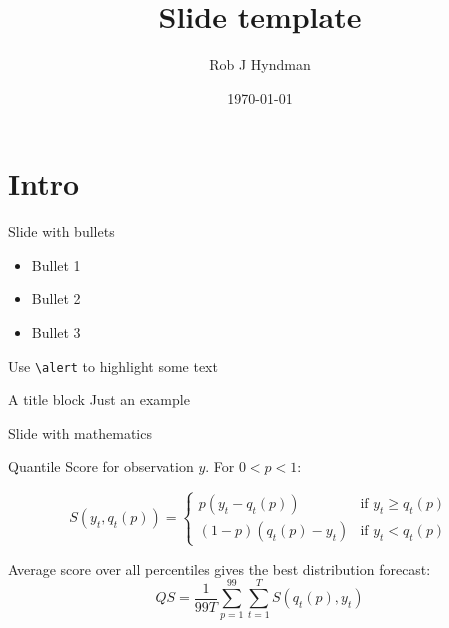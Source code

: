\documentclass[14pt,a4paper]{beamer}
\title{Slide template}
\author{Rob J Hyndman}
\date{\today}
\begin{document}
\begin{frame}
\titlepage
\end{frame}

\section{Intro}

\begin{frame}[fragile]{Slide with bullets}

\begin{itemize}
  \item Bullet 1
  \item Bullet 2
  \item Bullet 3
\end{itemize}


Use \verb|\alert| to \alert{highlight} some text

\begin{block}{A title block}
Just an example
\end{block}

\end{frame}

\begin{frame}{Slide with mathematics}

  Quantile Score for observation $y$.   For $0<p<1$:
  \begin{block}{}
    \[
      S(y_t,q_t(p)) = \left\{
      \begin{array}{rl}
      p(y_t-q_t(p)) & \text{if $y_t \ge q_t(p)$}\\
      (1-p)(q_t(p)-y_t) & \text{if $y_t < q_t(p)$}
      \end{array}\right.
    \]
  \end{block}
 
 Average score over all percentiles gives the best distribution forecast:
    \[
    QS = \frac{1}{99T}\sum_{p=1}^{99}\sum_{t=1}^T S(q_t(p),y_t)
    \]
 
\end{frame}
\end{document}

